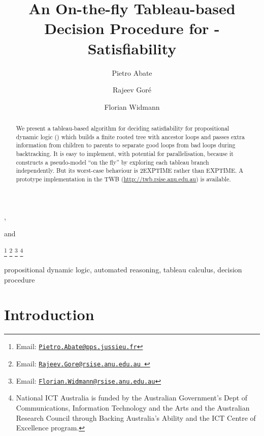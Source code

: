 \documentclass{entcs}
\newcommand{\pdl}{}
\begin{document}
\begin{frontmatter}
  \title{An On-the-fly Tableau-based Decision Procedure for \pdl{}-Satisfiability} 
  \author[Canberra]{Pietro Abate},
  \author[Canberra]{Rajeev Gor\'e} and
  \author[Nicta]{Florian Widmann} 
  \address[Canberra]{Computer Sciences Laboratory
    \\The Australian National University
    \\ Canberra, Australia}
  \address[Nicta]{Computer Sciences Laboratory
    and Logic \& Computation Programme
    \\The Australian National University and NICTA
    \\ Canberra, Australia}
  \thanks[myemail]{Email:
    \href{mailto:Pietro.Abate@pps.jussieu.fr}
    {\texttt{\normalshape Pietro.Abate@pps.jussieu.fr}}} 
  \thanks[coemail]{Email:
    \href{mailto:Rajeev.Gore@rsise.anu.edu.au }
    {\texttt{\normalshape Rajeev.Gore@rsise.anu.edu.au }}}
  \thanks[cocoemail]{Email:
    \href{mailto:Florian.Widmann@rsise.anu.edu.au} 
    {\texttt{\normalshape Florian.Widmann@rsise.anu.edu.au}}}
  \thanks[NICTA]{National ICT Australia is
    funded by the Australian Government's Dept of Communications,
    Information Technology and the Arts and the Australian Research
    Council through Backing Australia's Ability and the ICT Centre of
    Excellence program.}
  \begin{abstract} 
    We present a tableau-based algorithm 
    for deciding satisfiability for propositional dynamic logic (\pdl{})
    which builds a finite rooted tree with ancestor loops
    and passes extra information from children to parents
    to separate good loops from bad loops during backtracking.
    It is easy to implement, with potential for parallelisation,
    because it constructs a pseudo-model ``on the fly''
    by exploring each tableau branch independently. But its
    worst-case behaviour is 2EXPTIME rather than EXPTIME.
    A prototype implementation in the TWB
    (\url{http://twb.rsise.anu.edu.au})
    is available.
  \end{abstract}
  \begin{keyword}
    propositional dynamic logic, automated reasoning, tableau calculus,
    decision procedure
  \end{keyword}
\end{frontmatter}


\section{Introduction}
\end{document}
